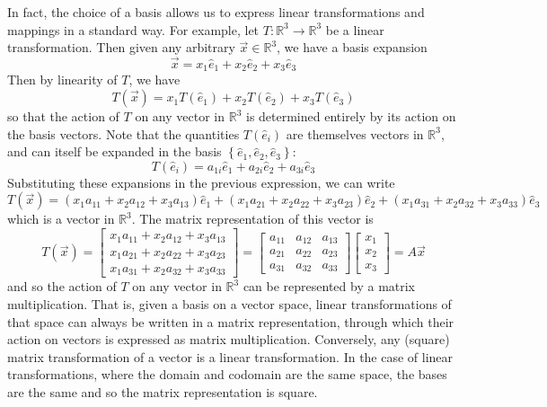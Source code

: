In fact, the choice of a basis allows us to express linear transformations and mappings in a standard way. For example, let $T:\mathbb{R}^3 \rightarrow \mathbb{R}^3$ be a linear transformation. Then given any arbitrary $\vec{x} \in \mathbb{R}^3$, we have a basis expansion \[ \vec{x} = x_1 \hat{e}_1 + x_2 \hat{e}_2 + x_3 \hat{e}_3 \] Then by linearity of $T$, we have \[ T\left(\vec{x}\right) = x_1 T\left(\hat{e}_1\right) + x_2 T\left(\hat{e}_2\right) + x_3 T\left(\hat{e}_3\right) \] so that the action of $T$ on any vector in $\mathbb{R}^3$ is determined entirely by its action on the basis vectors. Note that the quantities $T\left(\hat{e}_i\right)$ are themselves vectors in $\mathbb{R}^3$, and can itself be expanded in the basis $\left\{\hat{e}_1, \hat{e}_2, \hat{e}_3 \right\}$: \[ T\left(\hat{e}_i\right) = a_{1i} \hat{e}_1 + a_{2i} \hat{e}_2 + a_{3i} \hat{e}_3 \] 
Substituting these expansions in the previous expression, we can write
\[ T\left(\vec{x}\right) = \left(x_1 a_{11} + x_2 a_{12} + x_3 a_{13}\right) \hat{e}_1 + \left(x_1 a_{21} + x_2 a_{22} + x_3 a_{23}\right) \hat{e}_2 + \left(x_1 a_{31} + x_2 a_{32} + x_3 a_{33}\right) \hat{e}_3 \] which is a vector in $\mathbb{R}^3$. The matrix representation of this vector is  \[ T\left(\vec{x}\right) = \left[ \begin{array}{c} x_1 a_{11} + x_2 a_{12} + x_3 a_{13} \\ x_1 a_{21} + x_2 a_{22} + x_3 a_{23} \\ x_1 a_{31} + x_2 a_{32} + x_3 a_{33} \end{array} \right]  = \left[ \begin{array}{ccc} a_{11} & a_{12} & a_{13} \\ a_{21} & a_{22} & a_{23} \\ a_{31} & a_{32} & a_{33}   \end{array}  \right]   \left[ \begin{array}{c} x_1 \\ x_2 \\ x_3 \end{array} \right] = A\vec{x} \]  and so the action of $T$ on any vector in $\mathbb{R}^3$ can be represented by a matrix multiplication. That is, given a basis on a vector space, linear transformations of that space can always be written in a matrix representation, through which their action on vectors is expressed as matrix multiplication. Conversely, any (square) matrix transformation of a vector is a linear transformation. In the case of linear transformations, where the domain and codomain are the same space, the bases are the same and so the matrix representation is square.

